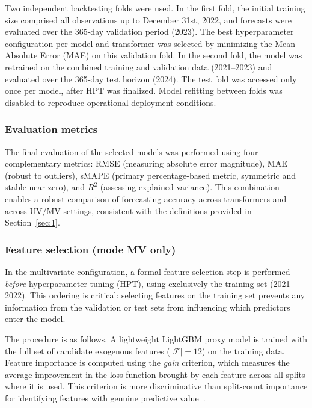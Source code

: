 Two independent backtesting folds were used. In the first fold, the initial training size comprised all observations up to December 31st, 2022, and forecasts were evaluated over the 365-day validation period (2023). The best hyperparameter configuration per model and transformer was selected by minimizing the Mean Absolute Error (MAE) on this validation fold. In the second fold, the model was retrained on the combined training and validation data (2021--2023) and evaluated over the 365-day test horizon (2024). The test fold was accessed only once per model, after HPT was finalized. Model refitting between folds was disabled to reproduce operational deployment conditions.


\subsubsection{Evaluation metrics}
The final evaluation of the selected models was performed using four complementary metrics: RMSE (measuring absolute error magnitude), MAE (robust to outliers), sMAPE (primary percentage-based metric, symmetric and stable near zero), and $R^2$ (assessing explained variance). This combination enables a robust comparison of forecasting accuracy across transformers and across UV/MV settings, consistent with the definitions provided in Section~\ref{sec:1}.

\subsubsection{Feature selection (mode MV only)}
\label{subsubsec:feature_selection}

In the multivariate configuration, a formal feature selection step is performed \emph{before} hyperparameter tuning (HPT), using exclusively the training set (2021--2022). This ordering is critical: selecting features on the training set prevents any information from the validation or test sets from influencing which predictors enter the model.

The procedure is as follows. A lightweight LightGBM proxy model is trained with the full set of candidate exogenous features ($|\mathcal{F}| = 12$) on the training data. Feature importance is computed using the \emph{gain} criterion, which measures the average improvement in the loss function brought by each feature across all splits where it is used. This criterion is more discriminative than split-count importance for identifying features with genuine predictive value~\cite{Chen2016XGBoost}.

